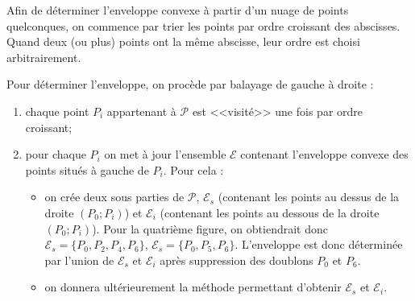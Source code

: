 \documentclass[10pt,fleqn]{article} %
\begin{document}
Afin de déterminer l'enveloppe convexe à partir d'un nuage de points quelconques, on commence par trier les points par ordre croissant des abscisses. Quand deux (ou plus) points ont la même abscisse, leur ordre est choisi arbitrairement.

Pour déterminer l'enveloppe, on procède par balayage de gauche à droite : 
\begin{enumerate}
\item chaque point $P_i$ appartenant à $\mathcal{P}$ est <<visité>> une fois par ordre croissant;
\item pour chaque $P_i$ on met à jour l'ensemble $\mathcal{E}$ contenant l'enveloppe convexe des points situés à gauche de $P_i$. Pour cela : 
\begin{itemize}
\item on crée deux sous parties de $\mathcal{P}$, $\mathcal{E}_s$ (contenant les points au dessus de la droite $(P_0;P_i)$) et $\mathcal{E}_i$ (contenant les points au dessous de la droite $(P_0;P_i)$). Pour la quatrième figure, on obtiendrait donc $\mathcal{E}_s = \{P_0, P_2, P_4, P_6 \}$, $\mathcal{E}_s = \{P_0, P_5, P_6 \}$. L'enveloppe est donc déterminée par l'union de 
$\mathcal{E}_s$ et $\mathcal{E}_i$ après suppression des doublons $P_0$ et $P_6$.
\item on donnera ultérieurement la méthode permettant d'obtenir $\mathcal{E}_s$ et $\mathcal{E}_i$.
\end{itemize}

\end{enumerate}

\end{document}
